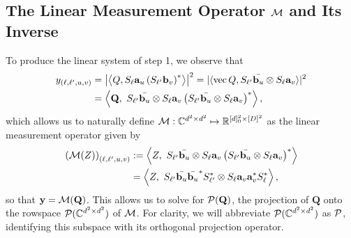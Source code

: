 \subsection{The Linear Measurement Operator $\mathcal{M}$ and Its Inverse}
\label{sec:linear}
To produce the linear system of step 1, we observe that
\begin{align*}%
y_{(\ell,\ell',u,v)} &= \left| \left\langle Q, S_{\ell} \a_u \left(S_{\ell'} \b_v \right)^* \right\rangle \right|^2 = |\langle \vec{Q}, S_{\ell'} \bar{\b_u} \otimes S_{\ell} \a_v \rangle |^2 \\%
&= \left\langle  \mathbf{Q}, ~S_{\ell'} \bar{\b_u} \otimes S_{\ell} \a_v \left(S_{\ell'} \bar{\b_u} \otimes S_{\ell} \a_v\right)^* \right\rangle,
\end{align*}
which allows us to naturally define $\mathcal{M}: \mathbb{C}^{d^2 \times d^2} \mapsto \mathbb{R}^{[d]_0^2 \times [D]^2}$ as the linear measurement operator given by 
\begin{equation}
  \begin{aligned}
\left(\mathcal{M}(Z) \right)_{(\ell,\ell',u,v)} &:= \left\langle  Z, ~S_{\ell'} \bar{\mathbf b_u} \otimes S_{\ell} \mathbf a_v \left(S_{\ell'} \bar{\mathbf b_u} \otimes S_{\ell} \mathbf a_v\right)^*\right\rangle \\ &= \left\langle Z, ~S_{\ell'} \bar{\mathbf b_u}\bar{\mathbf b_u}^* S^*_{\ell'} \otimes S_\ell \mathbf a_v \mathbf a_v^* S^*_\ell \right\rangle,
  \end{aligned}
  \label{eq:2d_meas_op}
\end{equation}
so that $\mathbf y = \mathcal{M}(\mathbf{Q})$.  This allows us to solve for $\mathcal{P}(\mathbf{Q})$, the projection of $\mathbf{Q}$ onto the rowspace $\mathcal{P}(\mathbb{C}^{d^2 \times d^2})$ of $\mathcal{M}$.  For clarity, we will abbreviate $\mathcal{P}(\mathbb{C}^{d^2 \times d^2})$ as $\mathcal{P}$, identifying this subspace with its orthogonal projection operator.

